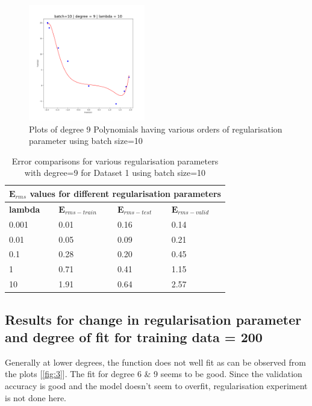 \begin{figure}[!ht]
    \centering
    \includegraphics[height=2in]{Task 1 Images/Batch 10/Figure_9.png}
    \caption{Plots of degree 9 Polynomials having various orders of regularisation parameter using batch size=10}
    \label{fig:2}
\end{figure}

{
\begin{table}[!ht]
\begin{tabular}{ |p{1.5cm}|p{3cm}|p{3cm}| p{3cm}|  }
\hline
\multicolumn{4}{|c|}{$\mathbf{E}_{rms}$ values for different regularisation parameters } \\
\hline
\rowcolor{lightgray} \textbf{lambda} & $\mathbf{E}_{rms-train}$ & $\mathbf{E}_{rms-test}$ & $\mathbf{E}_{rms-valid}$ \\
0.001   &   0.01  &  0.16   &  0.14   \\   
\hline
 0.01   &  0.05 &  0.09  &  0.21   \\   
 \hline
 0.1   &   0.28   &   0.20   &   0.45         \\
 \hline
 1   &   0.71   &    0.41        &     1.15     \\
 \hline
  10   &   1.91   &    0.64        &     2.57     \\
 \hline
\end{tabular}
\caption{Error comparisons for various regularisation parameters with degree=9 for Dataset 1 using batch size=10}
\label{table:2}
\end{table}
}


\subsection{Results for change in regularisation parameter and degree of fit for training data = 200}
Generally at lower degrees, the function does not well fit as can be observed from the plots [\ref{fig:3}]. The fit for degree 6 & 9 seems to be good. Since the validation accuracy is good and the model doesn't seem to overfit, regularisation experiment is not done here.


